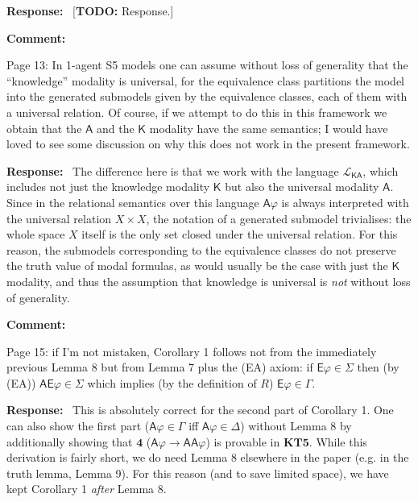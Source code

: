 \documentclass[12pt]{article}
\newcommand\todo[1]{{\color{red} [\textbf{TODO:} {#1}]}}
\newenvironment{comment}{
    \noindent\textbf{Comment:}\
    \em
}{\vspace{5mm}}
\newenvironment{response}{
    \noindent\textbf{Response:}\
}{\vspace{5mm}}
\renewcommand{\phi}{\varphi}
\newcommand{\E}{\mathsf{E}}
\newcommand{\A}{\mathsf{A}}
\newcommand{\K}{\mathsf{K}}
\begin{document}
\begin{response}
    \todo{Response.}
\end{response}

\begin{comment}
    Page 13: In 1-agent S5 models one can assume without loss of generality
    that the ``knowledge'' modality is universal, for the equivalence class
    partitions the model into the generated submodels given by the equivalence
    classes, each of them with a universal relation. Of course, if we attempt
    to do this in this framework we obtain that the $\A$ and the
    $\K$ modality have the same semantics; I would have loved to see
    some discussion on why this does not work in the present framework.
\end{comment}

\begin{response}
    The difference here is that we work with the language $\mathcal{L}_{\K\A}$,
    which includes not just the knowledge modality $\K$ but also the universal
    modality $\A$. Since in the relational semantics over this language
    $\A\phi$ is always interpreted with the universal relation $X \times X$,
    the notation of a generated submodel trivialises: the whole space $X$
    itself is the only set closed under the universal relation. For this
    reason, the submodels corresponding to the equivalence classes do not
    preserve the truth value of modal formulas, as would usually be the case
    with just the $\K$ modality, and thus the assumption that knowledge is
    universal is \emph{not} without loss of generality.
\end{response}

\begin{comment}
   Page 15: if I’m not mistaken, Corollary 1 follows not from the immediately
   previous Lemma 8 but from Lemma 7 plus the (EA) axiom: if $\E\phi \in
   \Sigma$ then (by (EA)) $\A\E\phi \in \Sigma$ which implies (by the
   definition of $R$) $\E\phi \in \Gamma$.
\end{comment}

\begin{response}
   This is absolutely correct for the second part of Corollary 1. One can also
   show the first part ($\A\phi \in \Gamma$ iff $\A\phi \in \Delta$) without
   Lemma 8 by additionally showing that $\mathbf{4}$ ($\A\phi \rightarrow
   \A\A\phi$) is provable in $\mathbf{KT5}$. While this derivation is fairly
   short, we do need Lemma 8 elsewhere in the paper (e.g. in the truth lemma,
   Lemma 9). For this reason (and to save limited space), we have kept
   Corollary 1 \emph{after} Lemma 8.
\end{response}
\end{document}
